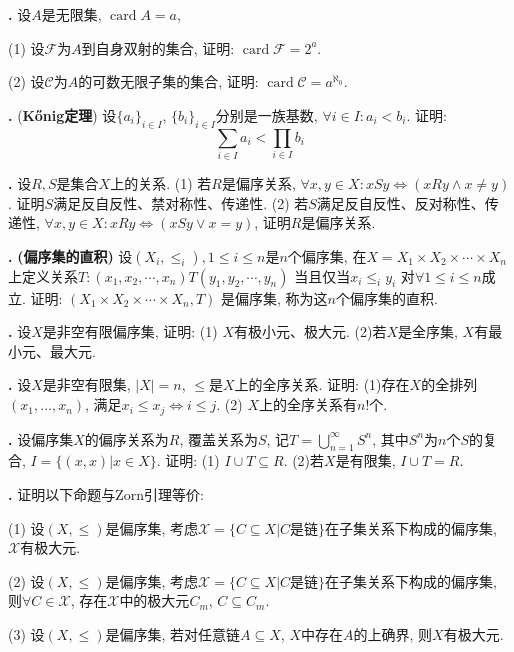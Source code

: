 \par \textbf{\theprobset .} \cite{NST} 设$A$是无限集, $\operatorname{card}A=a$, 

(1) 设$\mathcal{F}$为$A$到自身双射的集合, 证明: $\operatorname{card}\mathcal{F}=2^a$.

(2) 设$\mathcal{C}$为$A$的可数无限子集的集合, 证明: $\operatorname{card}\mathcal{C}=a^{\aleph_0}$.

\par \textbf{\theprobset .} (\textbf{Kőnig定理}) 设$\{a_i\}_{i\in I}$, $\{b_i\}_{i\in I}$分别是一族基数, $\forall i\in I: a_i < b_i$. 证明:
\begin{equation}
    \sum_{i\in I} a_i < \prod_{i\in I} b_i
\end{equation}

\par \textbf{\theprobset .} 设$R, S$是集合$X$上的关系. (1) 若$R$是偏序关系, $\forall x,y\in X: xSy \iff (xRy \land x\neq y)$. 证明$S$满足反自反性、禁对称性、传递性. (2) 若$S$满足反自反性、反对称性、传递性, $\forall x,y\in X: xRy \iff (xSy \lor x=y)$, 证明$R$是偏序关系. 

\par \textbf{\theprobset .} \textbf{(偏序集的直积)} 设$(X_i,\le_i),1\le i\le n$是$n$个偏序集, 在$X=X_1\times X_2 \times \cdots\times X_n$上定义关系$T:(x_1,x_2,\cdots,x_n)T(y_1,y_2,\cdots,y_n)$ 当且仅当$x_i\le_i y_i$ 对$\forall 1\le i\le n$成立. 证明: $(X_1\times X_2 \times \cdots\times X_n, T)$ 是偏序集, 称为这$n$个偏序集的直积.

\par \textbf{\theprobset .} 设$X$是非空有限偏序集, 证明: (1) $X$有极小元、极大元. (2)若$X$是全序集, $X$有最小元、最大元. 

\par \textbf{\theprobset .} 设$X$是非空有限集, $|X|=n$, $\le$是$X$上的全序关系. 证明: (1)存在$X$的全排列$(x_1,\dots,x_n)$, 满足$x_i\le x_j \iff i\le j$. (2) $X$上的全序关系有$n!$个. 

\par \textbf{\theprobset .} 设偏序集$X$的偏序关系为$R$, 覆盖关系为$S$, 记$T=\bigcup_{n=1}^\infty S^n$, 其中$S^n$为$n$个$S$的复合, $I=\{(x,x)\vert x\in X\}$. 证明: (1) $I\cup T\subseteq R$. (2)若$X$是有限集, $I\cup T=R$.

\par \textbf{\theprobset .} \cite{NST} 证明以下命题与Zorn引理等价:
\par (1) 设$(X, \le)$是偏序集, 考虑$\mathcal{X}=\{C\subseteq X\vert C\text{是链}\}$在子集关系下构成的偏序集, $\mathcal{X}$有极大元. 
\par (2) 设$(X, \le)$是偏序集, 考虑$\mathcal{X}=\{C\subseteq X\vert C\text{是链}\}$在子集关系下构成的偏序集, 则$\forall C\in \mathcal{X}$, 存在$\mathcal{X}$中的极大元$C_m$, $C\subseteq C_m$. 
\par (3) 设$(X,\le)$是偏序集, 若对任意链$A\subseteq X$, $X$中存在$A$的上确界, 则$X$有极大元. 

